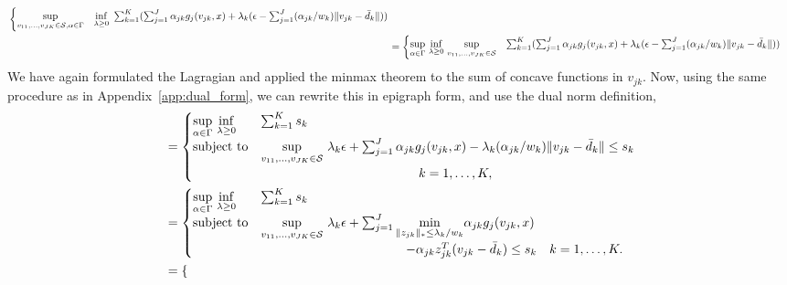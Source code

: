 \documentclass[12pt]{article}
\theoremstyle{thmstyleone}%
\theoremstyle{thmstyletwo}%
\theoremstyle{thmstylethree}%
\begin{document}
\begin{appendices}
{\begin{equation*}
\begin{aligned}
\begin{cases}
			\underset{v_{11}, \dots, v_{JK} \in \mathcal{S}, \alpha \in \Gamma}{\sup} & \underset{\lambda \geq 0}{\inf}~\sum_{k=1}^K (\sum_{j=1}^J \alpha_{jk} g_j(v_{jk}, x) + \lambda_k (\epsilon - \sum_{j=1}^J (\alpha_{jk}/w_k) \|v_{jk} - \bar{d}_k\|))\\
		\end{cases}\\
		&=\begin{cases}
			\underset{\alpha \in \Gamma}{\sup}~\underset{\lambda \geq 0}{\inf}~\underset{v_{11}, \dots, v_{JK} \in \mathcal{S}}{\sup}&\sum_{k=1}^K (\sum_{j=1}^J \alpha_{jk} g_j(v_{jk}, x) + \lambda_k (\epsilon - \sum_{j=1}^J (\alpha_{jk}/w_k)  \|v_{jk} - \bar{d}_k\|))\\
		\end{cases}\\
	\end{aligned}
\end{equation*}
We have again formulated the Lagragian and applied the minmax theorem to the sum of concave functions in $v_{jk}$.
Now, using the same procedure as in Appendix~\ref{app:dual_form}, we can rewrite this in epigraph form, and use the dual norm definition,
		\begin{equation*}
			\begin{aligned}
				&= \begin{cases}
					\underset{\alpha \in \Gamma}{\sup}~\underset{\lambda \geq 0}{\inf} &\sum_{k=1}^K s_k  \\
					\mbox{subject to}&\underset{v_{11}, \dots, v_{JK} \in \supp}{\sup}~ \lambda_k \epsilon+ \sum_{j=1}^J \alpha_{jk}g_j(v_{jk}, x) - \lambda_k(\alpha_{jk}/w_k) \|v_{jk} - \bar{d}_k\|\le s_k\\
					& \hspace{4cm}  \quad k = 1,\dots,K,
				\end{cases}\\
				&= \begin{cases}
					\underset{\alpha \in \Gamma}{\sup}~\underset{\lambda \geq 0}{\inf} &\sum_{k=1}^K s_k  \\
					\mbox{subject to}&\underset{v_{11}, \dots, v_{JK} \in \supp}{\sup}~ \lambda_k \epsilon+ \sum_{j=1}^J \underset{\|z_{jk}\|_* \leq \lambda_k/w_k}{\min} \alpha_{jk}g_j(v_{jk}, x) \\
					& \hspace{4cm} - \alpha_{jk}z_{jk}^T(v_{jk} - \bar{d}_k)\le s_k \quad k = 1,\dots,K.
				\end{cases}\\
				&= \begin{cases}

\end{cases}
\end{aligned}
\end{equation*}}
\end{appendices}
\end{document}
